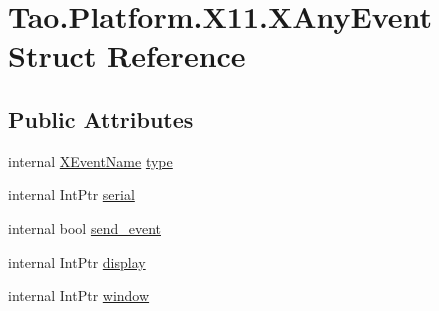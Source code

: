 \hypertarget{struct_tao_1_1_platform_1_1_x11_1_1_x_any_event}{
\section{Tao.Platform.X11.XAnyEvent Struct Reference}
\label{struct_tao_1_1_platform_1_1_x11_1_1_x_any_event}
}
\subsection*{Public Attributes}
\begin{DoxyCompactItemize}
\item 
internal \hyperlink{namespace_tao_1_1_platform_1_1_x11_aff81ed5b8778e1ea8e872861dff9f146}{XEventName} \hyperlink{struct_tao_1_1_platform_1_1_x11_1_1_x_any_event_a208b9bad10c608cdf800e361460a891d}{type}
\item 
internal IntPtr \hyperlink{struct_tao_1_1_platform_1_1_x11_1_1_x_any_event_a0022825df82690c2e70f470991dd9ef0}{serial}
\item 
internal bool \hyperlink{struct_tao_1_1_platform_1_1_x11_1_1_x_any_event_a87ed3046473de6eed6e0d81139ceb9d8}{send\_\-event}
\item 
internal IntPtr \hyperlink{struct_tao_1_1_platform_1_1_x11_1_1_x_any_event_a2fd1c3e11e7c316bd06959998f106fbe}{display}
\item 
internal IntPtr \hyperlink{struct_tao_1_1_platform_1_1_x11_1_1_x_any_event_ad08ed99cc92dde37693e394dacba3fe1}{window}
\end{DoxyCompactItemize}


